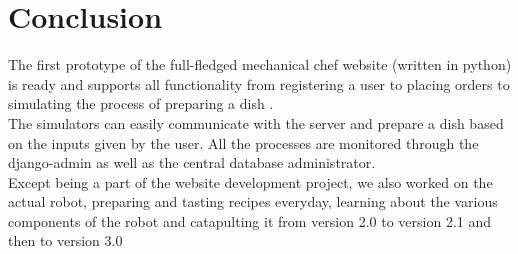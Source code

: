\chapter{Conclusion}
The first prototype of the full-fledged mechanical chef website (written in python) is ready and supports all functionality from registering a user to placing orders to simulating the process of preparing a dish .\\[0.1in]
The simulators can easily communicate with the server and prepare a dish based on the inputs given by the user. All the processes are monitored through the django-admin as well as the central database administrator. \\[0.1in]
Except being a part of the website development project, we also worked on the actual robot, preparing and tasting recipes everyday, learning about the various components of the robot and catapulting it from version 2.0 to version 2.1 and then to version 3.0 \\[0.1in]